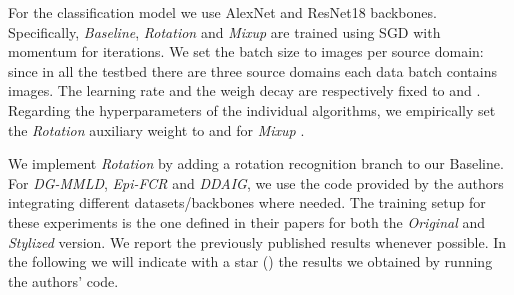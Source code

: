 For the classification model  we use AlexNet and ResNet18 backbones. Specifically, \emph{Baseline}, \emph{Rotation} and \emph{Mixup} are trained using SGD with  momentum for  iterations. We set the batch size to  images per source domain: since in all the testbed there are three source domains each data batch contains  images. The learning rate and the weigh decay are respectively fixed to  and . Regarding the hyperparameters of the individual algorithms, we empirically set the \emph{Rotation} auxiliary weight to  and for \emph{Mixup} .

We implement \emph{Rotation} by adding a rotation recognition branch to our Baseline.
For \emph{DG-MMLD}, \emph{Epi-FCR} and \emph{DDAIG}, we use the code provided by the authors integrating different datasets/backbones where needed. The training setup for these experiments is the one defined in their papers for both the \emph{Original} and \emph{Stylized} version. 
We report the previously published results whenever possible. In the following we will indicate with a star () the results we obtained by running the authors' code.

